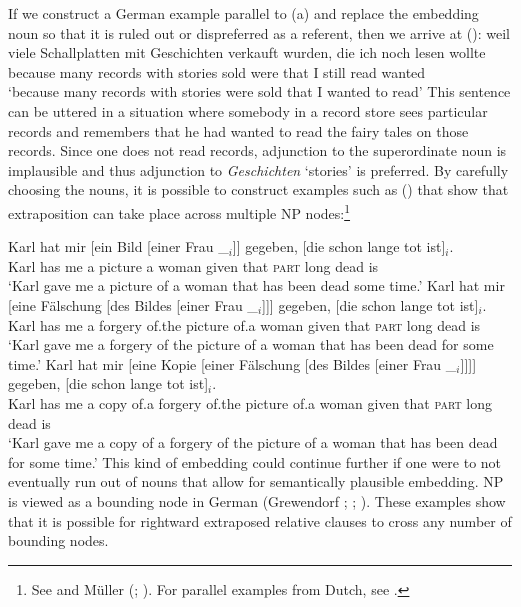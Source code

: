 If we construct a German example parallel to (a) and replace the embedding noun so that it is ruled out or dispreferred as a referent, then we arrive at ():
\ea
\gll weil viele Schallplatten mit Geschichten verkauft wurden, die ich noch lesen wollte\\
	 because many records with stories sold were that I still read wanted\\
\glt `because many records with stories were sold that I wanted to read'
\z
This sentence can be uttered in a situation where somebody in a record store sees particular records and remembers that he had
wanted to read the fairy tales on those records. Since one does not read records, adjunction to the superordinate noun is implausible
and thus adjunction to \emph{Geschichten} `stories' is preferred. By carefully choosing the nouns, it is possible to construct examples such as
() that show that extraposition can take place across multiple NP nodes:\footnote{%
  See  and Müller (\citeyear{Mueller2004d};
  \citeyear[Section~3]{Mueller2007c}). For parallel examples from
  Dutch, see .  
}

\eal
\ex 
\gll Karl hat mir [ein Bild [einer Frau \_$_i$]] gegeben, [die schon lange tot ist]$_i$.\\
	 Karl has me  \spacebr{}a picture  \spacebr{}a woman {} given \spacebr{}that \textsc{part} long dead is\\
\glt `Karl gave me a picture of a woman that has been dead some time.'
\ex 
\gll Karl hat mir [eine Fälschung [des Bildes [einer Frau \_$_i$]]] gegeben, [die schon lange tot ist]$_i$.\\
	Karl has me \spacebr{}a forgery \spacebr{}of.the picture \spacebr{}of.a woman {} given \spacebr{}that \textsc{part} long dead is\\
\glt `Karl gave me a forgery of the picture of a woman that has been dead for some time.'
\ex 
\gll Karl hat mir [eine Kopie [einer Fälschung [des Bildes [einer Frau \_$_i$]]]] gegeben, [die schon lange tot ist]$_i$.\\
	 Karl has me \spacebr{}a copy \spacebr{}of.a forgery \spacebr{}of.the picture \spacebr{}of.a woman {} given \spacebr{}that \textsc{part} long dead is\\
\glt `Karl gave me a copy of a forgery of the picture of a woman that has been dead for some time.'
\zl
This kind of embedding could continue further if one were to not eventually run out of nouns that
allow for semantically plausible embedding.
NP is viewed as a bounding node in German (Grewendorf \citeyear[]{Grewendorf88a};
\citeyear[--18]{Grewendorf2002a}; \citealp[]{Haider2001a}). These examples show that it is possible for rightward extraposed relative clauses
to cross any number of bounding nodes.


